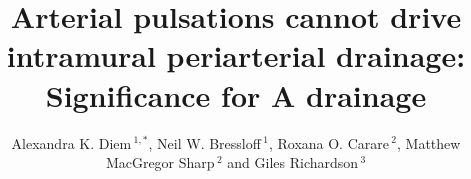 \documentclass{frontiersFPHY} %
\newcommand{\Ab}{A\textbeta\xspace}
\def\firstAuthorLast{Diem {et~al.}} %
\def\Authors{Alexandra K. Diem\,$^{1,*}$, Neil W. Bressloff\,$^{1}$, Roxana O. Carare\,$^{2}$, Matthew MacGregor Sharp\,$^{2}$ and Giles Richardson\,$^3$}
\begin{document}
\onecolumn
{}

\title[Arterial pulsations cannot drive periarterial drainage]{Arterial pulsations cannot drive intramural periarterial drainage: Significance for \Ab drainage} 

\author[\firstAuthorLast ]{\Authors} %
\address{} %
\correspondance{} %

\extraAuth{}%


\maketitle

\end{document}

